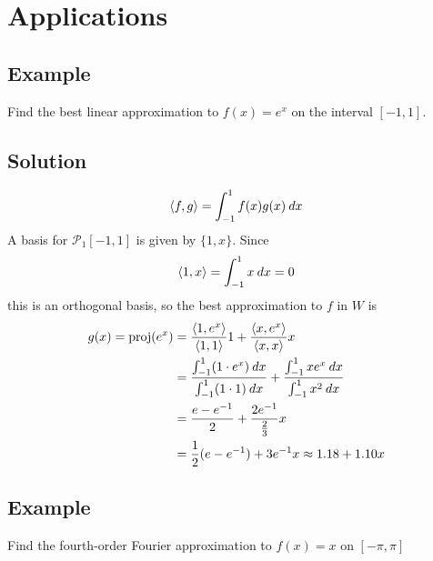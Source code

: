 \section{Applications}

\subsection*{Example}
Find the best linear approximation to $f(x) = e^x$ on the interval $[-1, 1]$.

\subsection*{Solution}
\[\ev{f,g}=\int_{-1}^1 f(x)g(x)\:dx\]
A basis for $\mathscr{P}_1[-1,1]$ is given by $\{1,x\}$. Since
\[\ev{1,x}=\int_{-1}^1 x\:dx=0\]
this is an orthogonal basis, so the best approximation to $f$ in $W$ is
\begin{align*}
    g(x)=\text{proj}(e^x) & =\frac{\ev{1,e^x}}{\ev{1,1}}1+\frac{\ev{x,e^x}}{\ev{x,x}}x                                                       \\
                          & =\frac{\int_{-1}^1 (1\cdot e^x)\:dx}{\int_{-1}^1 (1\cdot1)\:dx}+\frac{\int_{-1}^1 xe^x\:dx}{\int_{-1}^1 x^2\:dx} \\
                          & =\frac{e-e^{-1}}{2}+\frac{2e^{-1}}{\frac{2}{3}}x                                                                 \\
                          & =\frac{1}{2}(e-e^{-1})+3e^{-1}x\approx1.18+1.10x
\end{align*}

\subsection*{Example}
Find the fourth-order Fourier approximation to $f(x) = x$ on $[-\pi, \pi]$

